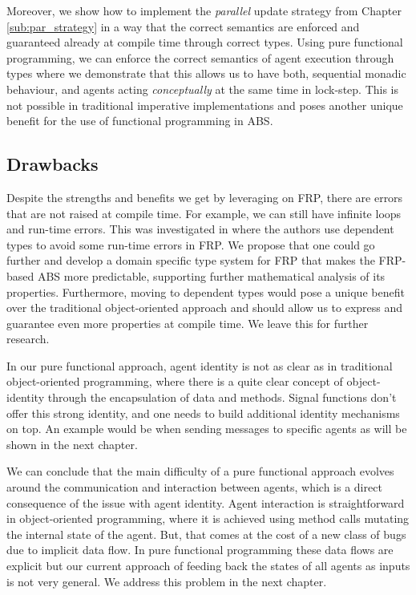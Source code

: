 Moreover, we show how to implement the \textit{parallel} update strategy from Chapter \ref{sub:par_strategy} in a way that the correct semantics are enforced and guaranteed already at compile time through correct types. Using pure functional programming, we can enforce the correct semantics of agent execution through types where we demonstrate that this allows us to have both, sequential monadic behaviour, and agents acting \textit{conceptually} at the same time in lock-step. This is not possible in traditional imperative implementations and poses another unique benefit for the use of functional programming in ABS.

\subsection{Drawbacks}
Despite the strengths and benefits we get by leveraging on FRP, there are errors that are not raised at compile time. For example, we can still have infinite loops and run-time errors. This was investigated in \cite{sculthorpe_safe_2009} where the authors use dependent types to avoid some run-time errors in FRP. We propose that one could go further and develop a domain specific type system for FRP that makes the FRP-based ABS more predictable, supporting further mathematical analysis of its properties. Furthermore, moving to dependent types would pose a unique benefit over the traditional object-oriented approach and should allow us to express and guarantee even more properties at compile time. We leave this for further research.

In our pure functional approach, agent identity is not as clear as in traditional object-oriented programming, where there is a quite clear concept of object-identity through the encapsulation of data and methods. Signal functions don't offer this strong identity, and one needs to build additional identity mechanisms on top. An example would be when sending messages to specific agents as will be shown in the next chapter.

We can conclude that the main difficulty of a pure functional approach evolves around the communication and interaction between agents, which is a direct consequence of the issue with agent identity. Agent interaction is straightforward in object-oriented programming, where it is achieved using method calls mutating the internal state of the agent. But, that comes at the cost of a new class of bugs due to implicit data flow. In pure functional programming these data flows are explicit but our current approach of feeding back the states of all agents as inputs is not very general. We address this problem in the next chapter.

